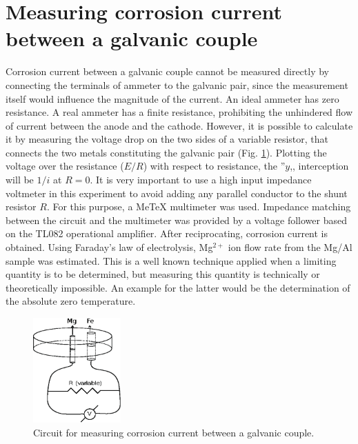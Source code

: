 	\section{Measuring corrosion current between a galvanic couple}
Corrosion current between a galvanic couple cannot be measured directly by connecting the terminals of ammeter to the galvanic pair, since the measurement itself would influence the magnitude of the current.
An ideal ammeter has zero resistance.
A real ammeter has a finite resistance, prohibiting the unhindered flow of current between the anode and the cathode.
However, it is possible to calculate it by measuring the voltage drop on the two sides of a variable resistor, that connects the two metals constituting the galvanic pair (Fig. \ref{fig:corrosion_current}).
Plotting the voltage over the resistance ($E/R$) with respect to resistance, the ''$y$,, interception will be $1/i$ at $R=0$.
It is very important to use a high input impedance voltmeter in this experiment to avoid adding any parallel conductor to the shunt resistor $R$.
For this purpose, a MeTeX multimeter was used.
Impedance matching between the circuit and the multimeter was provided by a voltage follower based on the TL082 operational amplifier.
After reciprocating, corrosion current is obtained.
Using Faraday's law of electrolysis, Mg$^{2+}$ ion flow rate from the Mg/Al sample was estimated.
This is a well known technique applied when a limiting quantity is to be determined, but measuring this quantity is technically or theoretically impossible.
An example for the latter would be the determination of the absolute zero temperature.

\begin{figure}
\centering
\includegraphics[width=0.3\textwidth]{img/corrosion_current.eps}
\caption[Circuit for measuring corrosion current between a galvanic couple.]{Circuit for measuring corrosion current between a galvanic couple.}

\label{fig:corrosion_current}
\end{figure}



